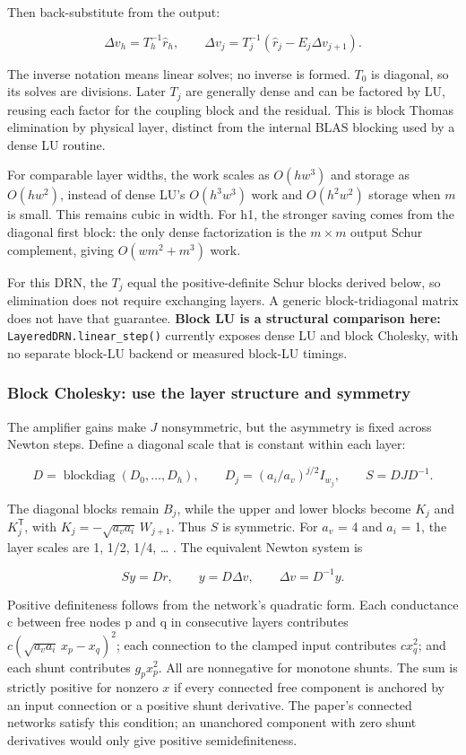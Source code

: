 \documentclass[11pt,a4paper]{article}
\begin{document}
Then back-substitute from the output:

\[
\Delta v_h = T_h^{-1}\widehat r_h, \qquad
\Delta v_j = T_j^{-1}(\widehat r_j-E_j\Delta v_{j+1}).
\]

The inverse notation means linear solves; no inverse is formed. $T_{0}$ is diagonal, so
its solves are divisions. Later $T_{j}$ are generally dense and can be factored by LU,
reusing each factor for the coupling block and the residual. This is block Thomas
elimination by physical layer, distinct from the internal BLAS blocking used by a dense
LU routine.

For comparable layer widths, the work scales as $O(hw^3)$ and storage as $O(hw^2)$,
instead of dense LU's $O(h^3w^3)$ work and $O(h^2w^2)$ storage when $m$ is small. This
remains cubic in width. For h1, the stronger saving comes from the diagonal first block:
the only dense factorization is the $m\times m$ output Schur complement, giving
$O(wm^2+m^3)$ work.

For this DRN, the $T_{j}$ equal the positive-definite Schur blocks derived below, so
elimination does not require exchanging layers. A generic block-tridiagonal matrix
does not have that guarantee. \textbf{Block LU is a structural comparison here:}
\nolinkurl{LayeredDRN.linear_step()} currently exposes dense LU and block Cholesky, with
no separate block-LU backend or measured block-LU timings.

\subsubsection*{Block Cholesky: use the layer structure and symmetry}

The amplifier gains make $J$ nonsymmetric, but the asymmetry is fixed across Newton
steps. Define a diagonal scale that is constant within each layer:

\[
D = \operatorname{blockdiag}(D_0,\ldots,D_h),
\qquad D_j=(a_i/a_v)^{j/2}I_{w_j},
\qquad S = D J D^{-1}.
\]

The diagonal blocks remain $B_{j}$, while the upper and lower blocks become $K_j$ and
$K_j^{\mathsf T}$, with $K_j=-\sqrt{a_va_i}\,W_{j+1}$. Thus $S$ is symmetric. For $a_v$ =
4 and $a_i$ = 1, the layer scales are 1, 1/2, 1/4, \ldots{} . The equivalent Newton
system is

\[
S y = D r, \qquad y = D\Delta v, \qquad \Delta v = D^{-1}y.
\]

Positive definiteness follows from the network's quadratic form. Each conductance c
between free nodes p and q in consecutive layers contributes
$c(\sqrt{a_va_i}\,x_p-x_q)^2$; each connection to the clamped input contributes
$cx_q^2$; and each shunt contributes $g_px_p^2$. All are nonnegative for monotone
shunts. The sum is strictly positive for nonzero $x$ if every connected free component
is anchored by an input connection or a positive shunt derivative. The paper's connected
networks satisfy this condition; an unanchored component with zero shunt derivatives
would only give positive semidefiniteness.
\end{document}
